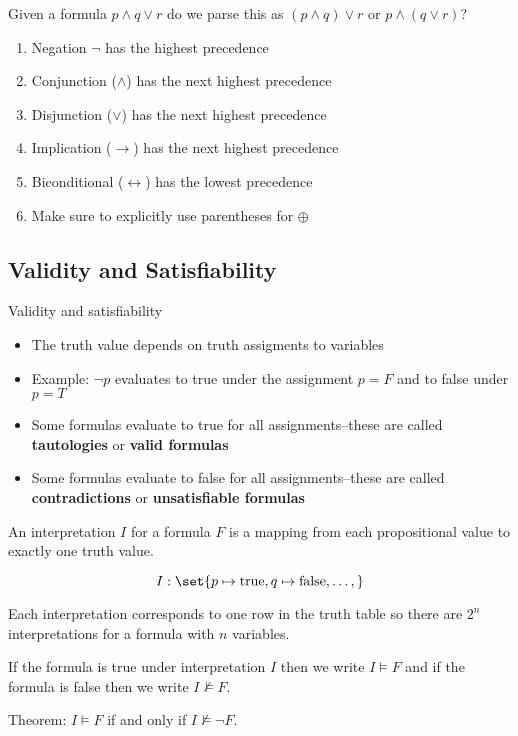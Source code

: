\begin{example}
	Given a formula $p\land q \lor r$ do we parse this as $(p\land q)\lor r$ or $p\land (q\lor r)$?

	\begin{enumerate}
		\item Negation $\neg$ has the highest precedence
		\item Conjunction ($\land$) has the next highest precedence
		\item Disjunction ($\lor$) has the next highest precedence
		\item Implication ($\rightarrow$) has the next highest precedence
		\item Biconditional ($\leftrightarrow$) has the lowest precedence
		\item Make sure to explicitly use parentheses for $\oplus$
	\end{enumerate}
\end{example}

\subsection{Validity and Satisfiability}

Validity and satisfiability
\begin{itemize}
	\item The truth value depends on truth assigments to variables
	\item Example: $\neg p$ evaluates to true under the assignment $p=F$ and to false under $p=T$
	\item Some formulas evaluate to true for all assignments--these are called \textbf{tautologies} or \textbf{valid formulas}
	\item Some formulas evaluate to false for all assignments--these are called \textbf{contradictions} or \textbf{unsatisfiable formulas}
\end{itemize}

\begin{definition}[Interpretation]
	An interpretation $I$ for a formula $F$ is a mapping from each propositional
	value to exactly one truth value.

	\[
		I: \set{p\mapsto \true, q\mapsto \false, \ldots,}
	\]

	Each interpretation corresponds to one row in the truth table so there are $2^n$ interpretations for a formula with $n$ variables.

	If the formula is true under interpretation $I$ then we write $I\models F$ and if the formula is false then we write $I\not\models F$.

	Theorem: $I\models F$ if and only if $I\not\models \neg F$.
\end{definition}

